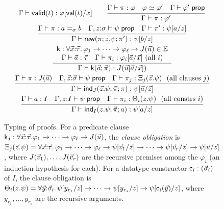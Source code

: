 \begin{figure}[t]
\[\begin{array}{c}
    {\Gamma \vdash \tvalid{t} : \subst{\varphi}{\tval{t}}{x}}
\qquad
\rul{\Gamma \vdash \pi : \varphi \quad \varphi \conv \varphi' \quad
     \Gamma \vdash \varphi' \sprop}
    {\Gamma \vdash \pi : \varphi'}
\\[2.2ex]
\rul{\Gamma \vdash \pi : a =_{\sigma} b \quad
     \Gamma, z{:}\sigma \vdash \psi \sprop \quad
     \Gamma \vdash \pi' : \subst{\psi}{a}{z}}
    {\Gamma \vdash \mathsf{rew}(\pi; z.\psi; \pi') : \subst{\psi}{b}{z}}
\\[2.2ex]
\rul{\begin{array}{c}
     \wcns{k} : \forall \tup{x}{:}\tup{\tau}.\,\varphi_1 \to \dots \to
       \varphi_\ell \to J(\tup{u}) \in \Env \\
     \Gamma \vdash \tup{a} : \tup{\tau} \quad
     \Gamma \vdash \pi_i : \subst{\varphi_i}{\tup{a}}{\tup{x}} \ (\text{all } i)
     \end{array}}
    {\Gamma \vdash \wcns{k}(\tup{a}; \tup{\pi}) :
       J(\subst{\tup{u}}{\tup{a}}{\tup{x}})}
\\[2.2ex]
\rul{\Gamma \vdash \pi : J(\tup{a}) \quad
     \Gamma, \tup{z}{:}\tup{\sigma} \vdash \psi \sprop \quad
     \Gamma \vdash \pi_j : \Xi_j(\tup{z}.\psi) \ \ (\text{all clauses } j)}
    {\Gamma \vdash \tind{J}(\tup{z}.\psi; \tup{\pi}; \pi) :
       \subst{\psi}{\tup{a}}{\tup{z}}}
\\[2.2ex]
\rul{\Gamma \vdash a : I \quad
     \Gamma, z{:}I \vdash \psi \sprop \quad
     \Gamma \vdash \pi_i : \Theta_i(z.\psi) \ \ (\text{all constrs } i)}
    {\Gamma \vdash \tind{I}(z.\psi; \tup{\pi}; a) : \subst{\psi}{a}{z}}
\end{array}
\]
\caption{Typing of proofs.  For a predicate clause
  $\mathsf{k}_j : \forall \vec{x}{:}\vec{\tau}.\varphi_1 \to \dots \to
  \varphi_\ell \to J(\vec{u})$, the \emph{clause obligation} is
  $\Xi_j(\vec{z}.\psi) = \forall \vec{x}{:}\vec{\tau}.\,\varphi_1 \to \dots
  \to \varphi_\ell \to \psi[\vec{v}_1/\vec{z}] \to \dots \to
  \psi[\vec{v}_r/\vec{z}] \to \psi[\vec{u}/\vec{z}]$,
  where $J(\vec{v}_1), \dots, J(\vec{v}_r)$ are the recursive premises
  among the $\varphi_i$ (an induction hypothesis for each).  For a
  datatype constructor $\mathsf{c}_i : (\vec{\sigma}_i)$ of $I$, the clause
  obligation is $\Theta_i(z.\psi) = \forall \vec{y}{:}\vec{\sigma}_i.\,
  \psi[y_{r_1}/z] \to \dots \to \psi[y_{r_s}/z] \to
  \psi[\mathsf{c}_i(\vec{y})/z]$, where $y_{r_1}, \dots, y_{r_s}$
  are the recursive arguments.}
\label{fig:proofs}
\end{figure}

